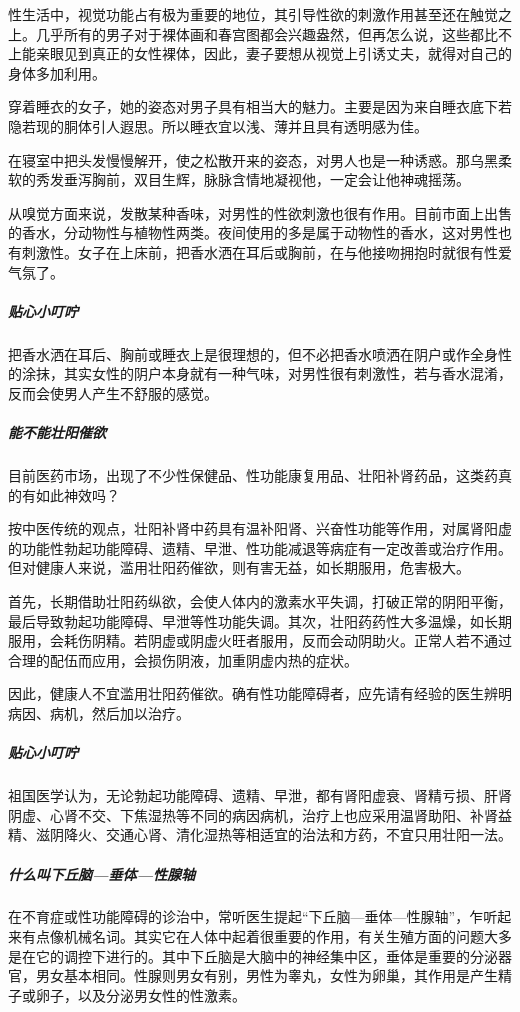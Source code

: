 性生活中，视觉功能占有极为重要的地位，其引导性欲的刺激作用甚至还在触觉之上。几乎所有的男子对于裸体画和春宫图都会兴趣盎然，但再怎么说，这些都比不上能亲眼见到真正的女性裸体，因此，妻子要想从视觉上引诱丈夫，就得对自己的身体多加利用。

穿着睡衣的女子，她的姿态对男子具有相当大的魅力。主要是因为来自睡衣底下若隐若现的胴体引人遐思。所以睡衣宜以浅、薄并且具有透明感为佳。

在寝室中把头发慢慢解开，使之松散开来的姿态，对男人也是一种诱惑。那乌黑柔软的秀发垂泻胸前，双目生辉，脉脉含情地凝视他，一定会让他神魂摇荡。

从嗅觉方面来说，发散某种香味，对男性的性欲刺激也很有作用。目前市面上出售的香水，分动物性与植物性两类。夜间使用的多是属于动物性的香水，这对男性也有刺激性。女子在上床前，把香水洒在耳后或胸前，在与他接吻拥抱时就很有性爱气氛了。

\subparagraph{贴心小叮咛}

把香水洒在耳后、胸前或睡衣上是很理想的，但不必把香水喷洒在阴户或作全身性的涂抹，其实女性的阴户本身就有一种气味，对男性很有刺激性，若与香水混淆，反而会使男人产生不舒服的感觉。

\subparagraph{能不能壮阳催欲}

目前医药市场，出现了不少性保健品、性功能康复用品、壮阳补肾药品，这类药真的有如此神效吗？

按中医传统的观点，壮阳补肾中药具有温补阳肾、兴奋性功能等作用，对属肾阳虚的功能性勃起功能障碍、遗精、早泄、性功能减退等病症有一定改善或治疗作用。但对健康人来说，滥用壮阳药催欲，则有害无益，如长期服用，危害极大。

首先，长期借助壮阳药纵欲，会使人体内的激素水平失调，打破正常的阴阳平衡，最后导致勃起功能障碍、早泄等性功能失调。其次，壮阳药药性大多温燥，如长期服用，会耗伤阴精。若阴虚或阴虚火旺者服用，反而会动阴助火。正常人若不通过合理的配伍而应用，会损伤阴液，加重阴虚内热的症状。

因此，健康人不宜滥用壮阳药催欲。确有性功能障碍者，应先请有经验的医生辨明病因、病机，然后加以治疗。

\subparagraph{贴心小叮咛}

祖国医学认为，无论勃起功能障碍、遗精、早泄，都有肾阳虚衰、肾精亏损、肝肾阴虚、心肾不交、下焦湿热等不同的病因病机，治疗上也应采用温肾助阳、补肾益精、滋阴降火、交通心肾、清化湿热等相适宜的治法和方药，不宜只用壮阳一法。

\subparagraph{什么叫下丘脑—垂体—性腺轴}

在不育症或性功能障碍的诊治中，常听医生提起“下丘脑—垂体—性腺轴”，乍听起来有点像机械名词。其实它在人体中起着很重要的作用，有关生殖方面的问题大多是在它的调控下进行的。其中下丘脑是大脑中的神经集中区，垂体是重要的分泌器官，男女基本相同。性腺则男女有别，男性为睾丸，女性为卵巢，其作用是产生精子或卵子，以及分泌男女性的性激素。

